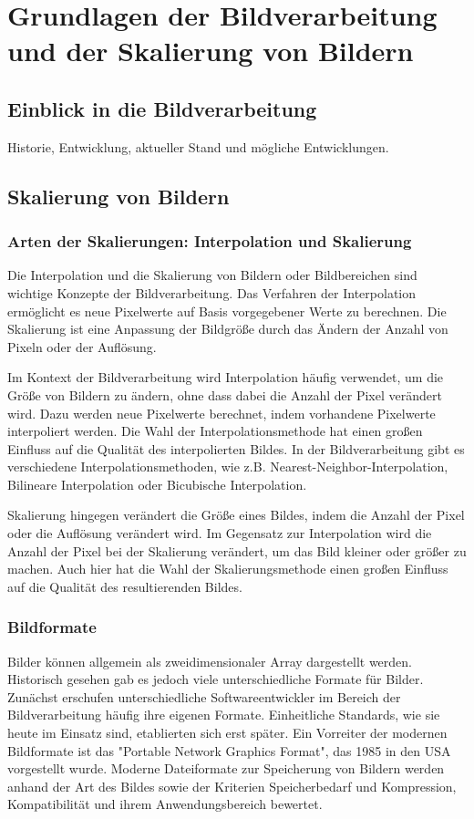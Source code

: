 



\chapter{Grundlagen der Bildverarbeitung und der Skalierung von Bildern}


\section{Einblick in die Bildverarbeitung}
Historie, Entwicklung, aktueller Stand und mögliche Entwicklungen.

\section{Skalierung von Bildern}

\subsection{Arten der Skalierungen: Interpolation und Skalierung}
Die Interpolation und die Skalierung von Bildern oder Bildbereichen sind wichtige Konzepte der Bildverarbeitung.
Das Verfahren der Interpolation ermöglicht es neue Pixelwerte auf Basis vorgegebener Werte zu berechnen.
Die Skalierung ist eine Anpassung der Bildgröße durch das Ändern der Anzahl von Pixeln oder der Auflösung.

Im Kontext der Bildverarbeitung wird Interpolation häufig verwendet, um die Größe von Bildern zu ändern, ohne dass dabei die Anzahl der Pixel verändert wird. Dazu werden neue Pixelwerte berechnet, indem vorhandene Pixelwerte interpoliert werden. Die Wahl der Interpolationsmethode hat einen großen Einfluss auf die Qualität des interpolierten Bildes. In der Bildverarbeitung gibt es verschiedene Interpolationsmethoden, wie z.B. Nearest-Neighbor-Interpolation, Bilineare Interpolation oder Bicubische Interpolation.

Skalierung hingegen verändert die Größe eines Bildes, indem die Anzahl der Pixel oder die Auflösung verändert wird. Im Gegensatz zur Interpolation wird die Anzahl der Pixel bei der Skalierung verändert, um das Bild kleiner oder größer zu machen. Auch hier hat die Wahl der Skalierungsmethode einen großen Einfluss auf die Qualität des resultierenden Bildes.

\subsection{Bildformate}
Bilder können allgemein als zweidimensionaler Array dargestellt werden.
Historisch gesehen gab es jedoch viele unterschiedliche Formate für Bilder. Zunächst erschufen unterschiedliche Softwareentwickler im Bereich der Bildverarbeitung häufig ihre eigenen Formate.
Einheitliche Standards, wie sie heute im Einsatz sind, etablierten sich erst später.
Ein Vorreiter der modernen Bildformate ist das "Portable Network Graphics Format", das 1985 in den USA vorgestellt wurde.
Moderne Dateiformate zur Speicherung von Bildern werden anhand der Art des Bildes sowie der Kriterien Speicherbedarf und Kompression, Kompatibilität und ihrem Anwendungsbereich bewertet. 
